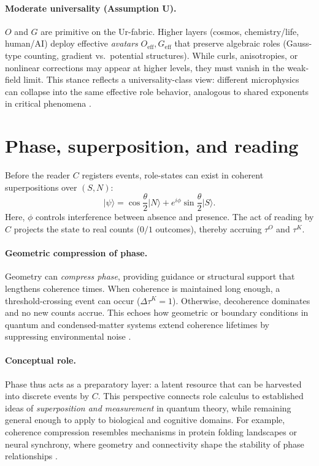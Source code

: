 \documentclass[12pt,a4paper,oneside]{scrreprt}
\begin{document}
\paragraph{Moderate universality (Assumption U).} 
$O$ and $G$ are primitive on the Ur-fabric. 
Higher layers (cosmos, chemistry/life, human/AI) deploy effective \emph{avatars} $O_{\mathrm{eff}}, G_{\mathrm{eff}}$ that preserve algebraic roles (Gauss-type counting, gradient vs.\ potential structures). 
While curls, anisotropies, or nonlinear corrections may appear at higher levels, they must vanish in the weak-field limit. 
This stance reflects a universality-class view: different microphysics can collapse into the same effective role behavior, analogous to shared exponents in critical phenomena \citep{Wilson1971RG}. 

\section{Phase, superposition, and reading}\label{sec:ur-phase}

Before the reader $C$ registers events, role-states can exist in coherent superpositions over $(S,N)$:
\[
\lvert \psi \rangle 
= \cos\frac{\theta}{2}\lvert N \rangle 
+ e^{i\phi}\sin\frac{\theta}{2}\lvert S \rangle.
\]
Here, $\phi$ controls interference between absence and presence. 
The act of reading by $C$ projects the state to real counts ($0/1$ outcomes), thereby accruing $\tau^O$ and $\tau^K$. 

\paragraph{Geometric compression of phase.} 
Geometry can \emph{compress phase}, providing guidance or structural support that lengthens coherence times. 
When coherence is maintained long enough, a threshold-crossing event can occur ($\Delta\tau^K = 1$). 
Otherwise, decoherence dominates and no new counts accrue. 
This echoes how geometric or boundary conditions in quantum and condensed-matter systems extend coherence lifetimes by suppressing environmental noise \citep{Zurek2003Decoherence}.

\paragraph{Conceptual role.} 
Phase thus acts as a preparatory layer: a latent resource that can be harvested into discrete events by $C$. 
This perspective connects role calculus to established ideas of \emph{superposition and measurement} in quantum theory, while remaining general enough to apply to biological and cognitive domains. 
For example, coherence compression resembles mechanisms in protein folding landscapes or neural synchrony, where geometry and connectivity shape the stability of phase relationships \citep{Tegmark2000Importance,Friston2010FEP}.
\end{document}
